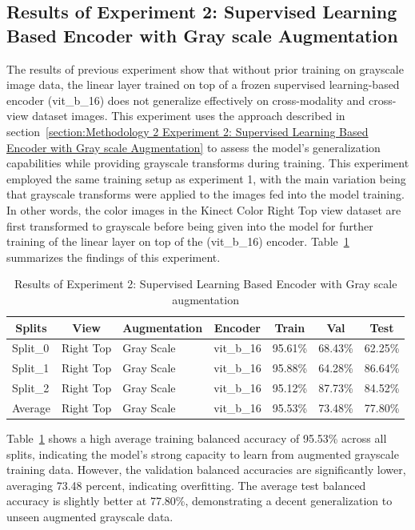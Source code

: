 \subsection{Results of Experiment 2: Supervised Learning Based Encoder with Gray scale Augmentation}
The results of previous experiment show that without prior training on grayscale image data, the linear layer trained on top of a frozen supervised learning-based encoder (vit\_b\_16) does not generalize effectively on cross-modality and cross-view dataset images. This experiment uses the approach described in section~\ref{section:Methodology 2 Experiment 2: Supervised Learning Based Encoder with Gray scale Augmentation} to assess the model's generalization capabilities while providing grayscale transforms during training. This experiment employed the same training setup as experiment 1, with the main variation being that grayscale transforms were applied to the images fed into the model training. In other words, the color images in the Kinect Color Right Top view dataset are first transformed to grayscale before being given into the model for further training of the linear layer on top of the (vit\_b\_16) encoder. Table~\ref{table:experiment 2 results} summarizes the findings of this experiment.
\begin{table}[htbp]
\caption{Results of Experiment 2: Supervised Learning Based Encoder with Gray scale augmentation}
\label{table:experiment 2 results}
\centering
\begin{tabular}{lllllll}
\multicolumn{1}{c}{\textbf{Splits}} & \multicolumn{1}{c}{\textbf{View}} & \multicolumn{1}{c}{\textbf{Augmentation}} & \multicolumn{1}{c}{\textbf{Encoder}} & \multicolumn{1}{c}{\textbf{Train}} & \multicolumn{1}{c}{\textbf{Val}} & \multicolumn{1}{c}{\textbf{Test}}\\
\hline
Split\_0 & Right Top & Gray Scale & vit\_b\_16 & 95.61\% & 68.43\% & 62.25\% \\
Split\_1 & Right Top & Gray Scale & vit\_b\_16 & 95.88\% & 64.28\% & 86.64\% \\
Split\_2 & Right Top & Gray Scale & vit\_b\_16 & 95.12\% & 87.73\% & 84.52\% \\
\hline
Average & Right Top & Gray Scale & vit\_b\_16 & 95.53\% & 73.48\% & 77.80\% \\
\hline
\end{tabular}
\end{table}

Table~\ref{table:experiment 2 results} shows a high average training balanced accuracy of 95.53\% across all splits, indicating the model's strong capacity to learn from augmented grayscale training data. However, the validation balanced accuracies are significantly lower, averaging 73.48 percent, indicating overfitting. The average test balanced accuracy is slightly better at 77.80\%, demonstrating a decent generalization to unseen augmented grayscale data. 

